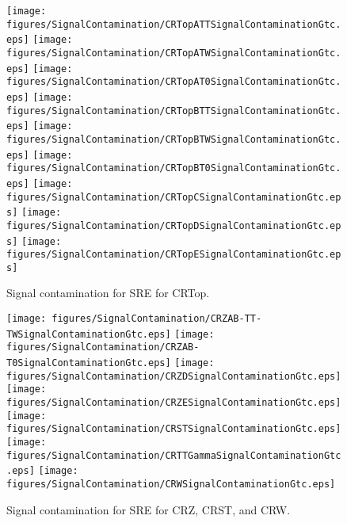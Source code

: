 \begin{figure}[htbp]
\begin{center} 
\texttt{[image: figures/SignalContamination/CRTopATTSignalContaminationGtc.eps]}
\texttt{[image: figures/SignalContamination/CRTopATWSignalContaminationGtc.eps]}
\texttt{[image: figures/SignalContamination/CRTopAT0SignalContaminationGtc.eps]}
\texttt{[image: figures/SignalContamination/CRTopBTTSignalContaminationGtc.eps]}
\texttt{[image: figures/SignalContamination/CRTopBTWSignalContaminationGtc.eps]}
\texttt{[image: figures/SignalContamination/CRTopBT0SignalContaminationGtc.eps]}
\texttt{[image: figures/SignalContamination/CRTopCSignalContaminationGtc.eps]}
\texttt{[image: figures/SignalContamination/CRTopDSignalContaminationGtc.eps]}
\texttt{[image: figures/SignalContamination/CRTopESignalContaminationGtc.eps]}
\caption{Signal contamination for SRE for CRTop.}
\label{fig:Fit2ele}
\end{center}
\end{figure}

\begin{figure}[htbp]
\begin{center} 
\texttt{[image: figures/SignalContamination/CRZAB-TT-TWSignalContaminationGtc.eps]}
\texttt{[image: figures/SignalContamination/CRZAB-T0SignalContaminationGtc.eps]}
\texttt{[image: figures/SignalContamination/CRZDSignalContaminationGtc.eps]}
\texttt{[image: figures/SignalContamination/CRZESignalContaminationGtc.eps]}
\texttt{[image: figures/SignalContamination/CRSTSignalContaminationGtc.eps]}
\texttt{[image: figures/SignalContamination/CRTTGammaSignalContaminationGtc.eps]}
\texttt{[image: figures/SignalContamination/CRWSignalContaminationGtc.eps]}
\caption{Signal contamination for SRE for CRZ, CRST, and CRW.}
\label{fig:Fit2ele}
\end{center}
\end{figure}



